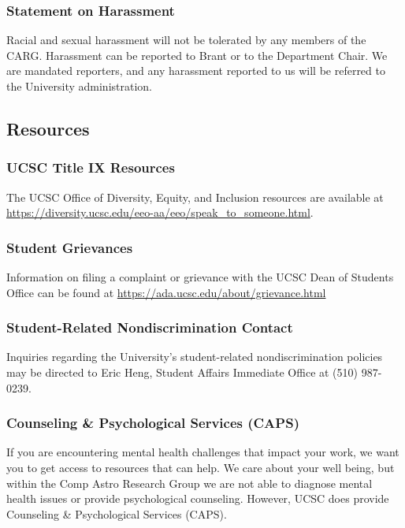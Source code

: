 \subsubsection{Statement on Harassment}

Racial and sexual harassment will not be tolerated by any members of
the CARG. Harassment can be reported to Brant or to the Department Chair.
We are mandated reporters, and any harassment reported to us will be
referred to the University administration.

\subsection{Resources}

\subsubsection{UCSC Title IX Resources}

The UCSC Office of Diversity, Equity, and Inclusion resources are available at
\href{https://diversity.ucsc.edu/eeo-aa/eeo/speak_to_someone.html}{https://diversity.ucsc.edu/eeo-aa/eeo/speak\_to\_someone.html}.

\subsubsection{Student Grievances}
\label{sec:student_grievances}

\noindent
Information on filing a complaint or grievance with the UCSC Dean of Students Office
can be found at
\href{https://ada.ucsc.edu/about/grievance.html}{https://ada.ucsc.edu/about/grievance.html}

\subsubsection{Student-Related Nondiscrimination Contact}
Inquiries regarding the University's student-related nondiscrimination policies may be directed to Eric Heng, Student Affairs Immediate Office at (510) 987-0239.

\subsubsection{Counseling \& Psychological Services (CAPS)}

If you are encountering mental health challenges that impact your work, we want you to get access to resources that can help. We care about your well being, but within the Comp Astro Research Group we are not able to diagnose mental health issues or provide psychological counseling. However, UCSC does provide Counseling \& Psychological Services (CAPS).\\

